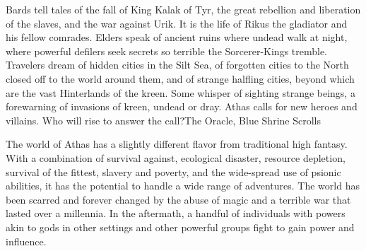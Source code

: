 {Bards tell tales of the fall of King Kalak of Tyr, the great rebellion and liberation of the slaves, and the war against Urik. It is the life of Rikus the gladiator and his fellow comrades. Elders speak of ancient ruins where undead walk at night, where powerful defilers seek secrets so terrible the Sorcerer-Kings tremble. Travelers dream of hidden cities in the Silt Sea, of forgotten cities to the North closed off to the world around them, and of strange halfling cities, beyond which are the vast Hinterlands of the kreen. Some whisper of sighting strange beings, a forewarning of invasions of kreen, undead or dray. Athas calls for new heroes and villains. Who will rise to answer the call?}{The Oracle, Blue Shrine Scrolls}

The world of Athas has a slightly different flavor from traditional high fantasy. With a combination of survival against, ecological disaster, resource depletion, survival of the fittest, slavery and poverty, and the wide-spread use of psionic abilities, it has the potential to handle a wide range of adventures. The world has been scarred and forever changed by the abuse of magic and a terrible war that lasted over a millennia. In the aftermath, a handful of individuals with powers akin to gods in other settings and other powerful groups fight to gain power and influence.









